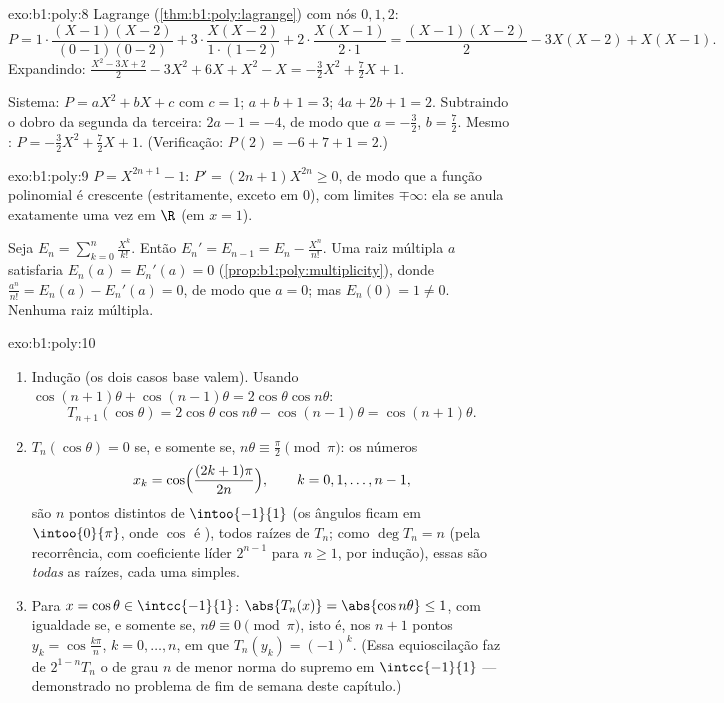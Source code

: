 \begin{solution}{exo:b1:poly:8}
Lagrange (\cref{thm:b1:poly:lagrange}) com nós $0, 1, 2$:
\[
P = 1\cdot\frac{(X-1)(X-2)}{(0-1)(0-2)} + 3\cdot\frac{X(X-2)}{1\cdot(1-2)}
+ 2\cdot\frac{X(X-1)}{2\cdot 1}
= \frac{(X-1)(X-2)}{2} - 3X(X-2) + X(X-1).
\]
Expandindo: $\frac{X^2 - 3X + 2}{2} - 3X^2 + 6X + X^2 - X =
-\frac{3}{2}X^2 + \frac{7}{2}X + 1$.

Sistema: $P = aX^2 + bX + c$ com $c = 1$; $a + b + 1 = 3$; $4a + 2b +
1 = 2$. Subtraindo o dobro da segunda da terceira: $2a - 1 = -4$,
de modo que $a = -\frac32$, $b = \frac72$. Mesmo :
$P = -\frac32 X^2 + \frac72 X + 1$. (Verificação: $P(2) = -6 + 7 + 1 = 2$.)
\end{solution}

\begin{solution}{exo:b1:poly:9}
$P = X^{2n+1} - 1$: $P' = (2n+1)X^{2n} \geq 0$, de modo que a função
polinomial é crescente (estritamente, exceto em $0$), com limites
$\mp\infty$: ela se anula exatamente uma vez em $\R$ (em $x = 1$).

Seja $E_n = \sum_{k=0}^{n} \frac{X^k}{k!}$. Então $E_n' = E_{n-1} = E_n
- \frac{X^n}{n!}$. Uma raiz múltipla $a$ satisfaria $E_n(a) =
E_n'(a) = 0$ (\cref{prop:b1:poly:multiplicity}), donde
$\frac{a^n}{n!} = E_n(a) - E_n'(a) = 0$, de modo que $a = 0$; mas $E_n(0) = 1
\neq 0$. Nenhuma raiz múltipla.
\end{solution}

\begin{solution}{exo:b1:poly:10}
\begin{enumerate}
  \item Indução (os dois casos base valem). Usando $\cos(n+1)\theta +
        \cos(n-1)\theta = 2\cos\theta\cos n\theta$:
        \[
        T_{n+1}(\cos\theta) = 2\cos\theta \cos n\theta -
        \cos(n-1)\theta = \cos(n+1)\theta .
        \]
  \item $T_n(\cos\theta) = 0$ se, e somente se, $n\theta \equiv \frac\pi2 \pmod
        \pi$: os números
        \[
        x_k = \cos\Bigl(\frac{(2k+1)\pi}{2n}\Bigr),
        \qquad k = 0, 1, \dots, n-1,
        \]
        são $n$ pontos distintos de $\intoo{-1}{1}$ (os ângulos ficam em
        $\intoo{0}{\pi}$, onde $\cos$ é ), todos raízes de
        $T_n$; como $\deg T_n = n$ (pela recorrência, com
        coeficiente líder $2^{n-1}$ para $n \geq 1$, por indução),
        essas são \emph{todas} as raízes, cada uma simples.
  \item Para $x = \cos\theta \in \intcc{-1}{1}$: $\abs{T_n(x)} =
        \abs{\cos n\theta} \leq 1$, com igualdade se, e somente se, $n\theta \equiv
        0 \pmod\pi$, isto é, nos $n+1$ pontos $y_k =
        \cos\frac{k\pi}{n}$, $k = 0, \dots, n$, em que $T_n(y_k) =
        (-1)^k$. (Essa equioscilação faz de $2^{1-n}T_n$ o  de grau $n$ de menor norma do supremo em
        $\intcc{-1}{1}$ --- demonstrado no problema de fim de semana
        deste capítulo.)
\end{enumerate}
\end{solution}

